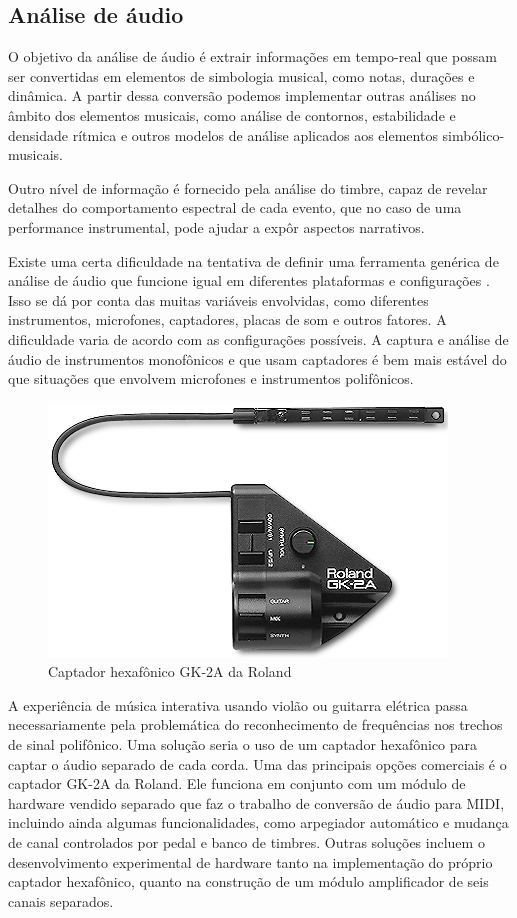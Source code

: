 \documentclass{ppgmus}
\begin{document}
\subsection{Análise de áudio}
\label{sec-audioanalise}


O objetivo da análise de áudio é extrair informações em tempo-real
que possam ser convertidas em elementos de simbologia musical, como notas, durações e dinâmica.
A partir dessa conversão podemos implementar outras análises no 
âmbito dos elementos musicais, como análise de contornos, estabilidade e 
densidade rítmica e outros modelos de análise aplicados aos elementos
simbólico-musicais. 

Outro nível de informação é fornecido pela análise do timbre, capaz
de revelar detalhes do comportamento espectral de cada evento, que no caso de uma 
performance instrumental, pode ajudar a expôr aspectos narrativos.

Existe uma certa dificuldade na tentativa de definir uma ferramenta genérica de análise de áudio 
que funcione igual em diferentes plataformas e configurações .
Isso se dá por conta das muitas variáveis envolvidas, como diferentes instrumentos, microfones, 
captadores, placas de som e outros fatores.
A dificuldade varia de acordo com as configurações possíveis. A captura e análise de áudio
 de instrumentos monofônicos e que usam captadores é bem mais estável
do que situações que envolvem microfones e instrumentos polifônicos.

\begin{figure}
\includegraphics[scale=.5]{gk-2a}
\caption{Captador hexafônico GK-2A da Roland}
\label{gk-2a}
\end{figure} 


A experiência de música interativa usando violão ou guitarra elétrica passa necessariamente
pela problemática do reconhecimento de frequências nos trechos de sinal polifônico.
Uma solução seria o uso de um captador hexafônico para captar o áudio separado de
cada corda. Uma das principais opções comerciais é o captador GK-2A da Roland.
Ele funciona em conjunto com um módulo de hardware vendido separado que faz o trabalho de conversão 
de áudio para MIDI, incluindo ainda algumas funcionalidades, como arpegiador automático
e mudança de canal controlados por pedal  e banco de timbres.
Outras soluções incluem o desenvolvimento experimental de hardware tanto na implementação
do próprio captador hexafônico, quanto na construção de um módulo amplificador de seis
canais separados.
\end{document}
